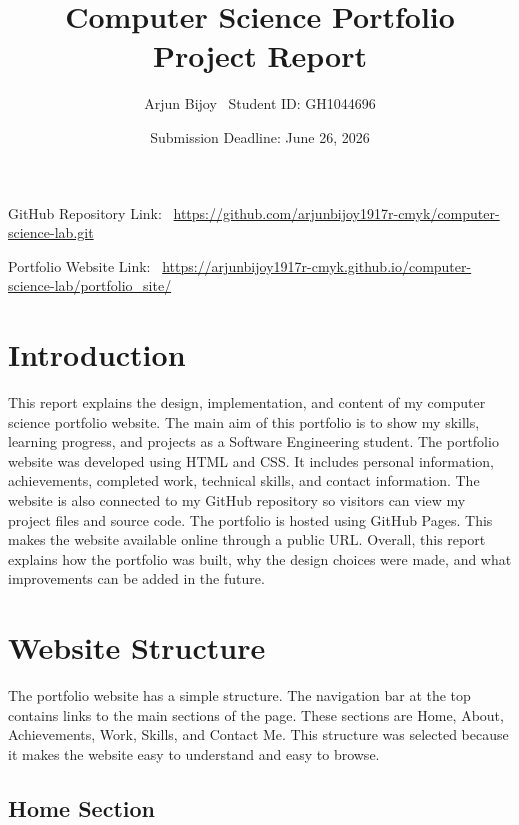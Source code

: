 \documentclass[12pt,a4paper]{article}
\title{Computer Science Portfolio Project Report}
\author{Arjun Bijoy \ Student ID: GH1044696}
\date{Submission Deadline: June 26, 2026}
\begin{document}
\maketitle

\begin{center}
GitHub Repository Link: \
\url{https://github.com/arjunbijoy1917r-cmyk/computer-science-lab.git}

\vspace{0.3cm}

Portfolio Website Link: \
\url{https://arjunbijoy1917r-cmyk.github.io/computer-science-lab/portfolio_site/}
\end{center}

\newpage

\tableofcontents

\newpage

\section{Introduction}

This report explains the design, implementation, and content of my computer science portfolio website. The main aim of this portfolio is to show my skills, learning progress, and projects as a Software Engineering student.
The portfolio website was developed using HTML and CSS. It includes personal information, achievements, completed work, technical skills, and contact information. The website is also connected to my GitHub repository so visitors can view my project files and source code.
The portfolio is hosted using GitHub Pages. This makes the website available online through a public URL. Overall, this report explains how the portfolio was built, why the design choices were made, and what improvements can be added in the future.

\section{Website Structure}

The portfolio website has a simple structure. The navigation bar at the top contains links to the main sections of the page. These sections are Home, About, Achievements, Work, Skills, and Contact Me.
This structure was selected because it makes the website easy to understand and easy to browse.

\subsection{Home Section}
\end{document}
